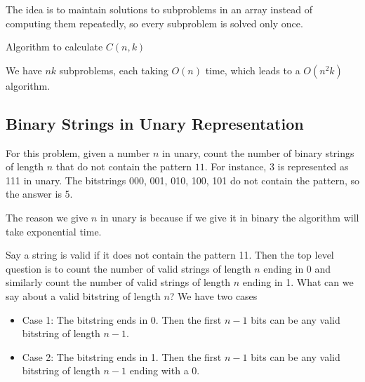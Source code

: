 The idea is to maintain solutions to subproblems in an array instead
of computing them repeatedly, so every subproblem is solved only once.

\begin{algorithm}
\caption{Algorithm to calculate $C(n, k)$}
\begin{algorithmic}
\ENDIF
{}
\ENDIF
{}
\ENDIF
{}
\ENDIF
\ENDFOR
{}
\end{algorithmic}
\end{algorithm}

We have $nk$ subproblems, each taking $O(n)$ time, which leads to a
$O(n^2k)$ algorithm.

\subsection{Binary Strings in Unary Representation}

For this problem, given a number $n$ in unary, count the number of
binary strings of length $n$ that do not contain the pattern $11$.
For instance, 3 is represented as 111 in unary. The bitstrings
000, 001, 010, 100, 101 do not contain the pattern, so the answer is
5.

\begin{remark}
    The reason we give $n$ in unary is because if we give it in binary
the algorithm will take exponential time.
\end{remark}

Say a string is valid if it does not contain the pattern 11. Then the
top level question is to count the number of valid strings of length
$n$ ending in 0 and similarly count the number of valid strings of
length $n$ ending in 1. What can we say about a valid bitstring of
length $n$? We have two cases

\begin{itemize}
    \item Case 1: The bitstring ends in 0. Then the first $n - 1$
    bits can be any valid bitstring of length $n - 1$.
    \item Case 2: The bitstring ends in 1. Then the first $n - 1$
    bits can be any valid bitstring of length $n - 1$ ending with a 0.
\end{itemize}

